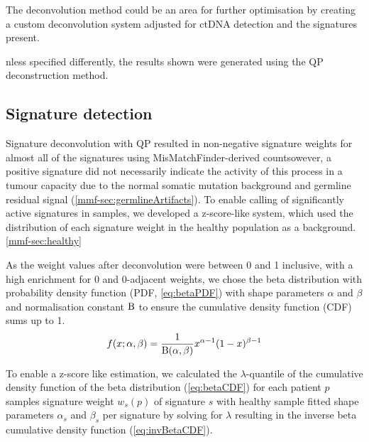 The deconvolution method could be an area for further optimisation by creating a custom deconvolution system adjusted for ctDNA detection and the signatures present.

nless specified differently, the results shown  were generated using the QP deconstruction method.



\subsection{Signature detection}
\label{mmf-sec:sigdetection}
Signature deconvolution with QP resulted in non-negative signature weights for almost all of the signatures using MisMatchFinder-derived countsowever, a positive signature did not necessarily indicate the activity of this process in a tumour capacity due to the normal somatic mutation background and germline residual signal (\autoref{mmf-sec:germlineArtifacts}). To enable  calling of significantly active signatures in samples, we developed a z-score-like system, which used the distribution of each signature weight in the healthy population as a background. \autoref{mmf-sec:healthy}

As the weight values after deconvolution were between 0 and 1 inclusive, with a high enrichment for 0 and 0-adjacent weights, we chose the beta distribution with probability density function (PDF, \autoref{eq:betaPDF}) with shape parameters $\alpha$ and $\beta$ and normalisation constant $\mathrm{B}$ to ensure the cumulative density function (CDF) sums up to 1. 
\begin{equation}
f(x; \alpha ,\beta)= \frac{1}{\mathrm{B}(\alpha, \beta)} x^{\alpha-1}(1-x)^{\beta-1}
\label{eq:betaPDF}
\end{equation}
\myequation[\ref{eq:betaPDF}]{Beta distribution probability density function}

To enable a z-score like estimation, we calculated the $\lambda$-quantile of the cumulative density function of the beta distribution (\autoref{eq:betaCDF}) for each patient $p$ samples signature weight $w_s(p)$ of signature $s$ with healthy sample fitted shape parameters $\alpha_s$ and $\beta_s$ per signature by solving  for $\lambda$ resulting in the inverse beta cumulative density function (\autoref{eq:invBetaCDF}). 

